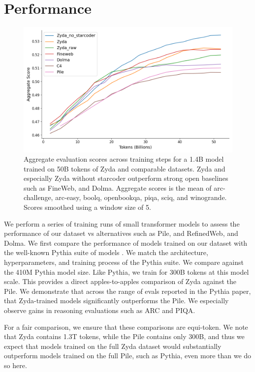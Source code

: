 \documentclass{article}
\begin{document}
\section{Performance}

\begin{figure}
    \centering
    \includegraphics[width=0.7\linewidth]{figures/scores_across_time_smoothed.png}
    \caption{Aggregate evaluation scores across training steps for a 1.4B model trained on 50B tokens of Zyda and comparable datasets. Zyda and especially Zyda without starcoder outperform strong open baselines such as FineWeb, and Dolma. Aggregate scores is the mean of arc-challenge, arc-easy, boolq, openbookqa, piqa, sciq, and winogrande. Scores smoothed using a window size of 5.}
    \label{fig:scores-across-time}
    \vspace{-3ex}
\end{figure}

We perform a series of training runs of small transformer models to assess the performance of our dataset vs alternatives such as Pile, and RefinedWeb, and Dolma. We first compare the performance of models trained on our dataset with the well-known Pythia suite of models \citep{biderman2023pythia}. We match the architecture, hyperparameters, and training process of the Pythia suite. We compare against the 410M Pythia model size. Like Pythia, we train for 300B tokens at this model scale. This provides a direct apples-to-apples comparison of Zyda against the Pile. We demonstrate that across the range of evals reported in the Pythia paper, that Zyda-trained models significantly outperforms the Pile. We especially observe gains in reasoning evaluations such as ARC and PIQA.

For a fair comparison, we ensure that these comparisons are equi-token. We note that Zyda contains 1.3T tokens, while the Pile contains only 300B, and thus we expect that models trained on the full Zyda dataset would substantially outperform models trained on the full Pile, such as Pythia, even more than we do so here.
\end{document}
